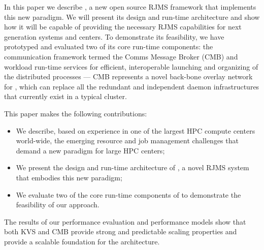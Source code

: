 In this paper we describe \flux, a new open source RJMS framework that implements
this new paradigm. We will present
its design and run-time architecture and show how it will be capable of providing
the necessary RJMS capabilities for next generation systems and centers. To
demonstrate its feasibility, we have prototyped and evaluated two of its core run-time components:
%
%
%
the communication framework termed the Comms Message Broker (CMB)
and workload run-time services for efficient, interoperable
launching and organizing of the distributed processes --- 
CMB represents a novel back-bone overlay network for \flux,
which can replace all the redundant and independent
daemon infrastructures that currently exist in a typical cluster.

This paper makes the following contributions:
\begin{itemize}
\item{We describe, based on experience in one of the largest HPC compute centers world-wide, the emerging resource and job management challenges that demand a new paradigm for large HPC centers;}
\item{We present the design and run-time architecture of \flux, a novel RJMS system that embodies this new paradigm;}
\item{We evaluate two of the core run-time components of \flux to demonstrate the feasibility of our approach.}
\end{itemize}

The results of our performance evaluation 
and performance models show that both KVS and CMB provide 
strong and predictable scaling properties and provide a scalable foundation 
for the \flux architecture.

